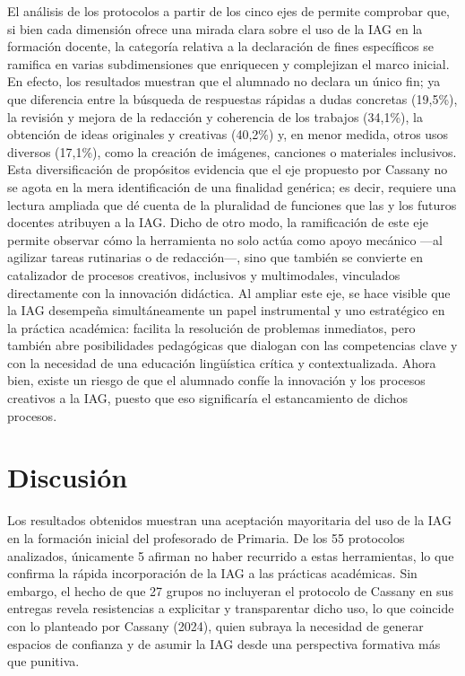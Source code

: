 \documentclass[spanish]{textolivre}
\begin{document}
El análisis de los protocolos a partir de los cinco ejes de \textcite{Cassany2024} permite comprobar que, si bien cada dimensión ofrece una mirada clara sobre el uso de la IAG en la formación docente, la categoría relativa a la declaración de fines específicos se ramifica en varias subdimensiones que enriquecen y complejizan el marco inicial. En efecto, los resultados muestran que el alumnado no declara un único fin; ya que diferencia entre la búsqueda de respuestas rápidas a dudas concretas (19,5\%), la revisión y mejora de la redacción y coherencia de los trabajos (34,1\%), la obtención de ideas originales y creativas (40,2\%) y, en menor medida, otros usos diversos (17,1\%), como la creación de imágenes, canciones o materiales inclusivos. Esta diversificación de propósitos evidencia que el eje propuesto por Cassany no se agota en la mera identificación de una finalidad genérica; es decir, requiere una lectura ampliada que dé cuenta de la pluralidad de funciones que las y los futuros docentes atribuyen a la IAG. Dicho de otro modo, la ramificación de este eje permite observar cómo la herramienta no solo actúa como apoyo mecánico —al agilizar tareas rutinarias o de redacción—, sino que también se convierte en catalizador de procesos creativos, inclusivos y multimodales, vinculados directamente con la innovación didáctica. Al ampliar este eje, se hace visible que la IAG desempeña simultáneamente un papel instrumental y uno estratégico en la práctica académica: facilita la resolución de problemas inmediatos, pero también abre posibilidades pedagógicas que dialogan con las competencias clave y con la necesidad de una educación lingüística crítica y contextualizada. Ahora bien, existe un riesgo de que el alumnado confíe la innovación y los procesos creativos a la IAG, puesto que eso significaría el estancamiento de dichos procesos.


\section{Discusión}\label{sec-organizacao-latex}
Los resultados obtenidos muestran una aceptación mayoritaria del uso de la IAG en la formación inicial del profesorado de Primaria. De los 55 protocolos analizados, únicamente 5 afirman no haber recurrido a estas herramientas, lo que confirma la rápida incorporación de la IAG a las prácticas académicas. Sin embargo, el hecho de que 27 grupos no incluyeran el protocolo de Cassany en sus entregas revela resistencias a explicitar y transparentar dicho uso, lo que coincide con lo planteado por Cassany (2024), quien subraya la necesidad de generar espacios de confianza y de asumir la IAG desde una perspectiva formativa más que punitiva.
\end{document}
